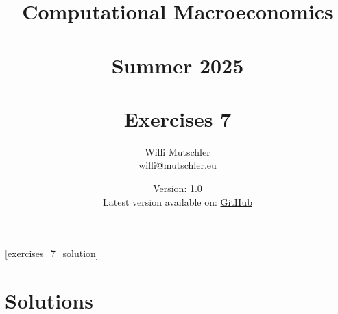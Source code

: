 
\newif\ifDisplaySolutions\DisplaySolutionstrue%


\title{Computational Macroeconomics\\~\\Summer 2025\\~\\Exercises 7}
\author{Willi Mutschler\\willi@mutschler.eu}
\date{Version: 1.0\\Latest version available on: \href{https://github.com/wmutschl/Computational-Macroeconomics/releases/latest/download/exercises_7.pdf}{GitHub}}
\maketitle\thispagestyle{empty}

\newpage
{}[exercises_7_solution]
\tableofcontents\thispagestyle{empty}\newpage

\setcounter{page}{1}
\newpage
\newpage
\newpage

\printbibliography%

\newpage

\ifDisplaySolutions%
\newpage
\appendix
\section{Solutions}

\fi
